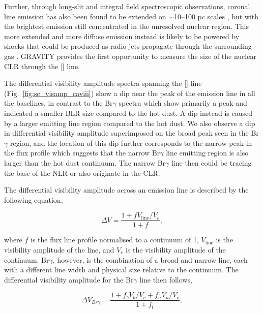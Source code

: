 \documentclass[longauth,]{aa}
\newcommand{\brg}{Br$\gamma$}
\newcommand{\caviii}{[\ion{Ca}{viii}]}
\begin{document}
Further, through long-slit and integral field spectroscopic observations, coronal line emission has also been found to be extended on $\sim$10--100 pc scales \citep[e.g][]{Prieto:2005ab,Mazzalay:2010aa,Muller-Sanchez:2011aa}, but with the brightest emission still concentrated in the unresolved nuclear region. This more extended and more diffuse emission instead is likely to be powered by shocks that could be produced as radio jets propagate through the surrounding gas \citep[e.g.][]{Rodriguez-Ardila:2002aa,Reunanen:2003aa,Rodriguez-Ardila:2006aa,Muller-Sanchez:2011aa,Rodriguez-Ardila:2017aa}. GRAVITY provides the first opportunity to measure the size of the nuclear CLR through the \caviii{} line.

The differential visibility amplitude spectra spanning the \caviii{} line (Fig.~\ref{fig:sc_visamp_caviii}) show a dip near the peak of the emission line in all the baselines, in contrast to the \brg{} spectra which show primarily a peak and indicated a smaller BLR size compared to the hot dust. A dip instead is caused by a larger emitting line region compared to the hot dust. We also observe a dip in differential visibility amplitude superimposed on the broad peak seen in the \brg{} region, and the location of this dip further corresponds to the narrow peak in the flux profile which suggests that the narrow \brg{} line emitting region is also larger than the hot dust continuum. The narrow \brg{} line then could be tracing the base of the NLR or also originate in the CLR. 

The differential visibility amplitude across an emission line is described by the following equation,

\begin{equation}\label{eq:diff_amp_single}
\Delta V = 
\frac{1 + f V_\mathrm{line}/V_c}{1 + f},
\end{equation}

\noindent where $f$ is the flux line profile normalised to a continuum of 1, $V_\mathrm{line}$ is the visibility amplitude of the line, and $V_c$ is the visibility amplitude of the continuum. \brg{}, however, is the combination of a broad and narrow line, each with a different line width and physical size relative to the continuum. The differential visibility amplitude for the \brg{} line then follows,

\begin{equation}\label{eq:diff_amp_double}
\Delta V_{Br\gamma} = 
\frac{1 + f_{b} V_b/V_c + f_{n} V_n/V_c}{1 + f_{t}},
\end{equation}
\end{document}
